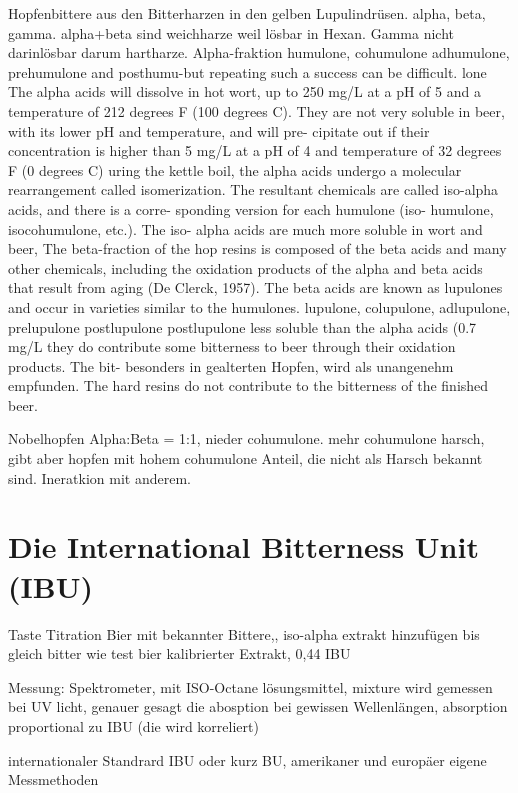 \documentclass[a4paper,parskip=half]{scrartcl}
\begin{document}
\parencite[55]{Hall1997}
Hopfenbittere aus den Bitterharzen in den gelben Lupulindrüsen.
alpha, beta, gamma. alpha+beta sind weichharze weil
lösbar in Hexan. Gamma nicht darinlösbar darum
hartharze. Alpha-fraktion humulone, cohumulone
adhumulone, prehumulone and posthumu-but repeating such a success can be difficult.
lone
The alpha acids will dissolve
in hot wort, up to 250 mg/L at a pH of 5 and
a temperature of 212 degrees F (100 degrees
C). They are not very soluble in beer, with
its lower pH and temperature, and will pre-
cipitate out if their concentration is higher
than 5 mg/L at a pH of 4 and temperature of
32 degrees F (0 degrees C)
uring the kettle boil, the alpha acids
undergo a molecular rearrangement called
isomerization. The resultant chemicals are
called iso-alpha acids, and there is a corre-
sponding version for each humulone (iso-
humulone, isocohumulone, etc.). The iso-
alpha acids are much more soluble in wort
and beer,
The beta-fraction of the hop resins is
composed of the beta acids and many other
chemicals, including the oxidation products
of the alpha and beta acids that result from
aging (De Clerck, 1957). The beta acids are
known as lupulones and occur in varieties
similar to the humulones.
lupulone,
colupulone, adlupulone, prelupulone
postlupulone
postlupulone
less soluble than the alpha acids (0.7 mg/L
they do contribute some bitterness to beer
through their oxidation products. The bit-
besonders in gealterten Hopfen, wird
als unangenehm empfunden.
The hard resins do not contribute to the
bitterness of the finished beer.

\parencite[35]{Garetz1994}
Nobelhopfen Alpha:Beta = 1:1, nieder cohumulone.
mehr cohumulone harsch, gibt aber hopfen mit hohem cohumulone
Anteil, die nicht als Harsch bekannt sind. Ineratkion
mit anderem.


\section*{Die International Bitterness Unit (IBU)}

\parencite[145-151]{Garetz1994}
Taste Titration 
Bier mit bekannter Bittere,, iso-alpha extrakt hinzufügen
bis gleich bitter wie test bier kalibrierter Extrakt, 0,44 IBU

\parencite[121]{Garetz1994} 
Messung: Spektrometer, mit ISO-Octane lösungsmittel, mixture
wird gemessen bei UV licht, genauer gesagt die abosption
bei gewissen Wellenlängen, absorption proportional
zu IBU (die wird korreliert)

\parencite[120\psq]{Garetz1994}
internationaler Standrard IBU oder kurz BU, amerikaner und
europäer eigene Messmethoden
\end{document}
